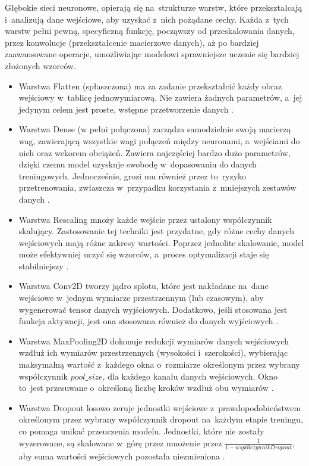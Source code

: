 Głębokie sieci neuronowe, opierają się na~strukturze warstw,
które przekształcają i~analizują dane wejściowe, aby uzyskać z~nich pożądane cechy.
Każda z~tych warstw pełni pewną, specyficzną funkcję, począwszy od przeskalowania danych,
przez konwolucje (przekształcenie macierzowe danych),
aż po bardziej zaawansowane operacje, umożliwiając modelowi sprawniejsze uczenie się bardziej złożonych wzorców.
\begin{itemize}[label=-,labelsep=0.4cm,leftmargin=0.6cm]   
	\item Warstwa Flatten (spłaszczona) ma za zadanie przekształcić każdy obraz wejściowy w~tablicę jednowymiarową.
		Nie zawiera żadnych parametrów, a~jej jedynym celem jest proste, wstępne przetworzenie danych \cite{Geron2020}.
	\item Warstwa Dense (w pełni połączona) zarządza samodzielnie swoją macierzą wag,
		zawierającą wszystkie wagi połączeń między neuronami, a~wejściami do nich oraz wekorem obciążeń.
		Zawiera najczęściej bardzo dużo parametrów, dzięki czemu model uzyskuje swobodę w~dopasowaniu do danych treningowych.
		Jednocześnie, grozi mu również przez to~ryzyko przetrenowania,
		zwłaszcza w~przypadku korzystania z~mniejszych zestawów danych \cite{Geron2020}.
    \item Warstwa Rescaling mnoży każde wejście przez ustalony współczynnik skalujący.
		Zastosowanie tej techniki jest przydatne, gdy różne cechy danych wejściowych mają różne zakresy wartości.
		Poprzez jednolite skalowanie, model może efektywniej uczyć się wzorców, a~proces optymalizacji staje się stabilniejszy \cite{Fenner2020}.
	\item Warstwa Conv2D tworzy jądro splotu, które jest nakładane na~dane wejściowe w~jednym wymiarze przestrzennym (lub czasowym), 
		aby wygenerować tensor danych wyjściowych.
		Dodatkowo, jeśli stosowana jest funkcja aktywacji, jest ona stosowana również do danych wyjściowych \cite{Geron2020}.
	\item Warstwa MaxPooling2D dokonuje redukcji wymiarów danych wejściowych wzdłuż ich wymiarów przestrzennych (wysokości i~szerokości),
		wybierając maksymalną wartość z~każdego okna o~rozmiarze określonym przez wybrany współczynnik $pool\_size$,
		dla każdego kanału danych wejściowych.
		Okno to~jest przesuwane o~określoną liczbę kroków wzdłuż obu wymiarów \cite{Geron2020}.
	\item Warstwa Dropout losowo zeruje jednostki wejściowe z~prawdopodobieństwem określonym
		przez wybrany współczynnik dropout na~każdym etapie treningu, co pomaga unikać przeuczenia modelu.
		Jednostki, które nie zostały wyzerowane, są skalowane w~górę przez mnożenie przez $\frac{1}{1 - współczynnikDropout}$,
		aby suma wartości wejściowych pozostała niezmieniona \cite{Geron2020}.
\end{itemize}